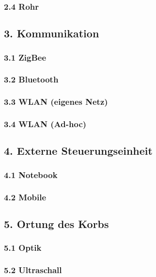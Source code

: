 \subsubsection{2.4 Rohr}

\subsection{3. Kommunikation}

\subsubsection{3.1 ZigBee}

\subsubsection{3.2 Bluetooth}

\subsubsection{3.3 WLAN (eigenes Netz)}

\subsubsection{3.4 WLAN (Ad-hoc)}

\subsection{4. Externe Steuerungseinheit}

\subsubsection{4.1 Notebook}

\subsubsection{4.2 Mobile}

\subsection{5. Ortung des Korbs}

\subsubsection{5.1 Optik}

\subsubsection{5.2 Ultraschall}


